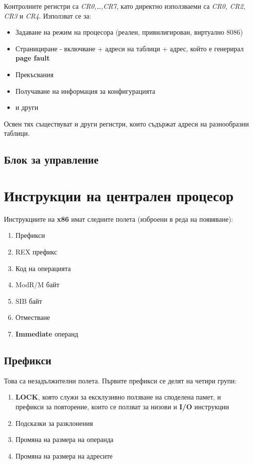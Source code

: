 \documentclass[fleqn,12pt]{article}
\begin{document}
Контролните регистри са \textit{CR0,\dots,CR7}, като директно използваеми са \textit{CR0, CR2, CR3} и \textit{CR4}. Използват се за:
\begin{itemize}
    \item Задаване на режим на процесора (реален, привилигирован, виртуално 8086)
    \item Странициране - включване + адреси на таблици + адрес, който е генерирал \textbf{page fault}
    \item Прекъсвания
    \item Получаване на информация за конфигурацията
    \item и други
\end{itemize}

Освен тях съществуват и други регистри, които съдържат адреси на разнообразни таблици.

\subsection{Блок за управление}

\section{Инструкции на централен процесор}
Инструкциите на \textbf{x86} имат следните полета (изброени в реда на появяване):
\begin{enumerate}
    \item Префикси
    \item REX префикс
    \item Код на операцията
    \item ModR/M байт
    \item SIB байт
    \item Отместване
    \item \textbf{Immediate} операнд
\end{enumerate}

\subsection{Префикси}
Това са незадължителни полета. Първите префикси се делят на четири групи:
\begin{enumerate}
    \item \textbf{LOCK}, която служи за ексклузивно ползване на споделена памет, и префикси за повторение, които се ползват за низови и \textbf{I/O} инструкции
    \item Подсказки за разклонения
    \item Промяна на размера на операнда
    \item Промяна на размера на адресите 
\end{enumerate}
\end{document}

